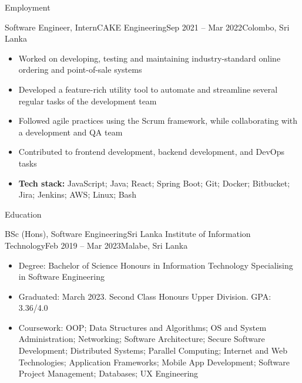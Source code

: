 \documentclass[garamond, a4paper]{modest-cv}
\begin{document}
	\makeheader

	\begin{cvsection}{Employment}
		\begin{cvsubsection}[2]{Software Engineer, Intern}{CAKE Engineering}{Sep 2021 -- Mar 2022}{Colombo, Sri Lanka}
			\begin{itemize}
				\item Worked on developing, testing and maintaining industry-standard online ordering and point-of-sale systems
				\item Developed a feature-rich utility tool to automate and streamline several regular tasks of the development team
				\item Followed agile practices using the Scrum framework, while collaborating with a development and QA team
				\item Contributed to frontend development, backend development, and DevOps tasks
				\item \textbf{Tech stack:} JavaScript; Java; React; Spring Boot; Git; Docker; Bitbucket; Jira; Jenkins; AWS; Linux; Bash
			\end{itemize}
		\end{cvsubsection}
	\end{cvsection}

	\begin{cvsection}{Education}
		\begin{cvsubsection}[2]{BSc (Hons), Software Engineering}{Sri Lanka Institute of Information Technology}{Feb 2019 -- Mar 2023}{Malabe, Sri Lanka}
			\begin{itemize}
				\item Degree: Bachelor of Science Honours in Information Technology Specialising in Software Engineering
				\item Graduated: March 2023. Second Class Honours Upper Division. GPA: 3.36/4.0
				\item Coursework: OOP; Data Structures and Algorithms; OS and System Administration; Networking; Software Architecture; Secure Software Development; Distributed Systems; Parallel Computing; Internet and Web Technologies; Application Frameworks; Mobile App Development; Software Project Management; Databases; UX Engineering
			\end{itemize}
		\end{cvsubsection}
	\end{cvsection}
\end{document}

